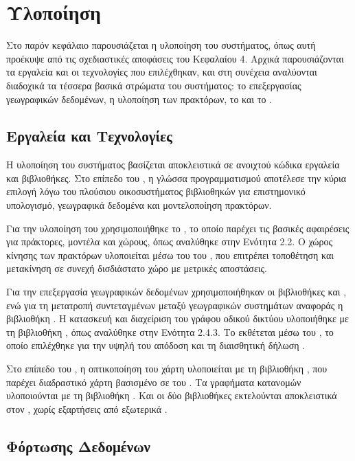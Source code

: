 \chapter{Υλοποίηση}

Στο παρόν κεφάλαιο παρουσιάζεται η υλοποίηση του συστήματος,
όπως αυτή προέκυψε από τις σχεδιαστικές αποφάσεις του
Κεφαλαίου 4. Αρχικά παρουσιάζονται τα εργαλεία και οι
τεχνολογίες που επιλέχθηκαν, και στη συνέχεια αναλύονται
διαδοχικά τα τέσσερα βασικά στρώματα του συστήματος:
το  επεξεργασίας γεωγραφικών δεδομένων,
η υλοποίηση των πρακτόρων, το  και το
.

\section{Εργαλεία και Τεχνολογίες}

Η υλοποίηση του συστήματος βασίζεται αποκλειστικά σε ανοιχτού
κώδικα εργαλεία και βιβλιοθήκες. Στο επίπεδο του ,
η γλώσσα προγραμματισμού  αποτέλεσε την κύρια
επιλογή λόγω του πλούσιου οικοσυστήματος βιβλιοθηκών για
επιστημονικό υπολογισμό, γεωγραφικά δεδομένα και
μοντελοποίηση πρακτόρων.

Για την υλοποίηση του  χρησιμοποιήθηκε το
, το οποίο παρέχει τις βασικές αφαιρέσεις
για πράκτορες, μοντέλα και χώρους, όπως αναλύθηκε στην
Ενότητα 2.2. Ο χώρος κίνησης των πρακτόρων υλοποιείται μέσω
του  του , που επιτρέπει
τοποθέτηση και μετακίνηση σε συνεχή δισδιάστατο χώρο με
μετρικές αποστάσεις.

Για την επεξεργασία γεωγραφικών δεδομένων χρησιμοποιήθηκαν
οι βιβλιοθήκες  και , ενώ για τη
μετατροπή συντεταγμένων μεταξύ γεωγραφικών συστημάτων αναφοράς
η βιβλιοθήκη . Η κατασκευή και διαχείριση του γράφου
οδικού δικτύου υλοποιήθηκε με τη βιβλιοθήκη , όπως
αναλύθηκε στην Ενότητα 2.4.3. Το  εκθέτεται μέσω
του , το οποίο επιλέχθηκε για την υψηλή
του απόδοση και τη διαισθητική δήλωση .

Στο επίπεδο του , η οπτικοποίηση του χάρτη
υλοποιείται με τη βιβλιοθήκη , που παρέχει
διαδραστικό χάρτη βασισμένο σε  του
. Τα γραφήματα κατανομών υλοποιούνται με
τη βιβλιοθήκη . Και οι δύο βιβλιοθήκες
εκτελούνται αποκλειστικά στον , χωρίς εξαρτήσεις
από εξωτερικά .

\section{ Φόρτωσης  Δεδομένων}

